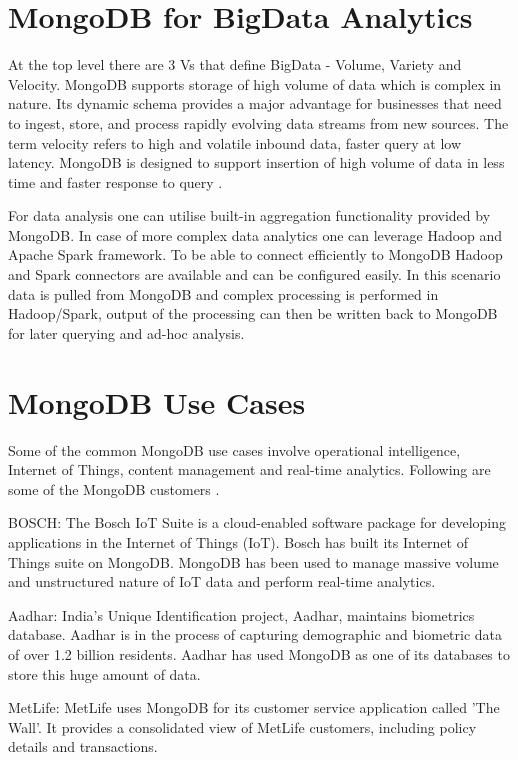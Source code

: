 \documentclass[9pt,twocolumn,twoside]{../../styles/osajnl}
\begin{document}
\section{MongoDB for BigData Analytics}

At the top level there are 3 Vs that define BigData - Volume, Variety and Velocity. MongoDB supports storage of high volume of data which is complex in nature. Its dynamic schema provides a major advantage for businesses that need to ingest, store, and process rapidly evolving data streams from new sources. The term velocity refers to high and volatile inbound data, faster query at low latency. MongoDB is designed to support insertion of high volume of data in less time and faster response to query \cite{www-mongo1}.

For data analysis one can utilise built-in aggregation functionality provided by MongoDB. In case of more complex data analytics one can leverage Hadoop and Apache Spark framework. To be able to connect efficiently to MongoDB Hadoop and Spark connectors are available and can be configured easily. In this scenario data is pulled from MongoDB and complex processing is performed in Hadoop/Spark, output of the processing can then be written back to MongoDB for later querying and ad-hoc analysis.

\section{MongoDB Use Cases}

Some of the common MongoDB use cases involve operational intelligence, Internet of Things, content management and real-time analytics. Following are some of the MongoDB customers \cite{www-mongo14}.

BOSCH: The Bosch IoT Suite is a cloud-enabled software package for developing applications in the Internet of Things (IoT). Bosch has built its Internet of Things suite on MongoDB. MongoDB has been used to manage massive volume and unstructured nature of IoT data and perform real-time analytics.

Aadhar: India’s Unique Identification project, Aadhar, maintains biometrics database. Aadhar is in the process of capturing demographic and biometric data of over 1.2 billion residents. Aadhar has used MongoDB as one of its databases to store this huge amount of data. 

MetLife: MetLife uses MongoDB for its customer service application called 'The Wall'. It provides a consolidated view of MetLife customers, including policy details and transactions. 
\end{document}
